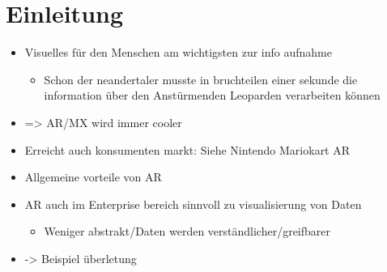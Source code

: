 \section{Einleitung}

\begin{itemize}
	\item Visuelles für den Menschen am wichtigsten zur info aufnahme
	\begin{itemize}
		\item Schon der neandertaler musste in bruchteilen einer sekunde die information über den Anstürmenden Leoparden verarbeiten können
	\end{itemize}
	
	\item => AR/MX wird immer cooler
	\item Erreicht auch konsumenten markt: Siehe Nintendo Mariokart AR
	\item Allgemeine vorteile von AR
	\item AR auch im Enterprise bereich sinnvoll zu visualisierung von Daten
	\begin{itemize}
		\item Weniger abstrakt/Daten werden verständlicher/greifbarer
	\end{itemize}
	
	\item -> Beispiel überletung
\end{itemize}